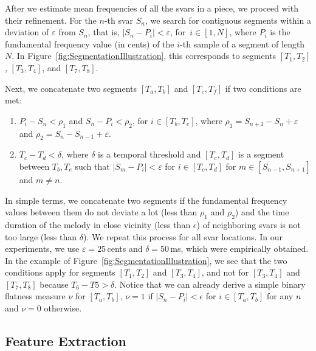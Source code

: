 {{%

After we estimate mean frequencies of all the svars in a piece, we proceed with their refinement. For the $n$-th svar $S_n$, we search for contiguous segments within a deviation of $\varepsilon$ from $S_n$, that is, $\vert S_n-P_i \vert < \varepsilon$, for~$i\in[1,N]$, where $P_i$ is the fundamental frequency value (in cents) of the $i$-th sample of a segment of length $N$. In Figure~\ref{fig:SegmentationIllustration}, this corresponds to segments $[T_1,T_2]$, $[T_3,T_4]$, and $[T_7,T_8]$.

Next, we concatenate two segments $[T_a,T_b]$ and $[T_e,T_f]$ if two conditions are met:
\begin{enumerate}
	\item $P_i-S_n < \rho_1$ and $S_n-P_i < \rho_2$, for $i\in[T_b,T_e]$, where $\rho_1 = S_{n+1}-S_n + \varepsilon$ and $\rho_2 = S_n-S_{n-1} + \varepsilon$. 
	\item $T_c-T_d < \delta$, where $\delta$ is a temporal threshold and $[T_c,T_d]$ is a segment between $T_b, T_e$ such that $\vert S_m-P_i\vert <\varepsilon$ for $i\in[T_c,T_d]$ for $m\in [S_{n-1}, S_{n+1}]$ and $m \neq n$.
\end{enumerate}
In simple terms, we concatenate two segments if the fundamental frequency values between them do not deviate a lot (less than $\rho_1$ and $\rho_2$) and the time duration of the melody in close vicinity (less than $\epsilon$) of neighboring svars is not too large (less than $\delta$). We repeat this process for all svar locations. In our experiments, we use $\varepsilon = 25$\,cents and $\delta=50$\,ms, which were empirically obtained. In the example of Figure~\ref{fig:SegmentationIllustration}, we see that the two conditions apply for segments $[T_1,T_2]$ and $[T_3,T_4]$, and not for $[T_3,T_4]$ and $[T_7,T_8]$ because $T_6-T5>\delta$. Notice that we can already derive a simple binary flatness measure $\nu$ for $[T_a, T_b]$, $\nu=1$ if $\vert S_n-P_i \vert< \epsilon$ for $i \in [T_a, T_b]$ for any $n$ and $\nu=0$ otherwise. 

\subsection{Feature Extraction}
\label{sec:features}

}}
